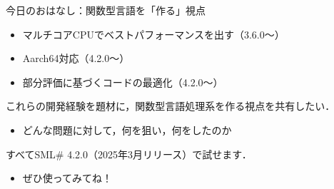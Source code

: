 \documentclass[aspectratio=169,t,dvipdfmx,12pt]{beamer}
\newcommand\smlsharp{SML\#}
\begin{document}
\begin{frame}{今日のおはなし：関数型言語を「作る」視点}

\begin{itemize}
\item マルチコアCPUでベストパフォーマンスを出す（3.6.0〜）
\item Aarch64対応（4.2.0〜）
\item 部分評価に基づくコードの最適化（4.2.0〜）
\end{itemize}

\bigskip

これらの開発経験を題材に，関数型言語処理系を作る視点を共有したい．
\begin{itemize}
\item どんな問題に対して，何を狙い，何をしたのか
\end{itemize}

\pause\bigskip

すべて\smlsharp{} 4.2.0（2025年3月リリース）で試せます．
\begin{itemize}
\item ぜひ使ってみてね！
\end{itemize}

\end{frame}
\end{document}
